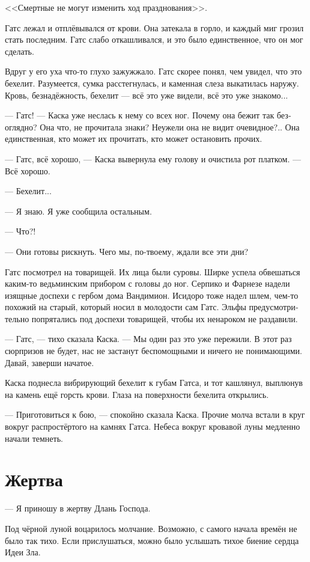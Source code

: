 \documentclass[a4paper,12pt,fleqn]{book}\usepackage{polyglossia}\setdefaultlanguage[babelshorthands=true]{russian}\setotherlanguage{english}\defaultfontfeatures{Ligatures=TeX,Mapping=tex-text}\usepackage{xcolor}\newcommand{\ml}[3]{#2}
\begin{document}
<<Смертные не могут изменить ход празднования>>.

Гатс лежал и отплёвывался от крови.
Она затекала в горло, и каждый миг грозил стать последним.
Гатс слабо откашливался, и это было единственное, что он мог сделать.

Вдруг у его уха что-то глухо зажужжало.
Гатс скорее понял, чем увидел, что это бехелит.
Разумеется, сумка расстегнулась, и каменная слеза выкатилась наружу.
Кровь, безнадёжность, бехелит --- всё это уже видели, всё это уже знакомо...

--- Гатс! --- Каска уже неслась к нему со всех ног.
Почему она бежит так безоглядно?
Она что, не прочитала знаки?
Неужели она не видит очевидное?..
Она единственная, кто может их прочитать, кто может остановить прочих.

--- Гатс, всё хорошо, --- Каска вывернула ему голову и очистила рот платком.
--- Всё хорошо.

--- Бехелит...

--- Я знаю.
Я уже сообщила остальным.

--- Что?!

--- Они готовы рискнуть.
Чего мы, по-твоему, ждали все эти дни?

Гатс посмотрел на товарищей.
Их лица были суровы.
Ширке успела обвешаться каким-то ведьминским прибором с головы до ног.
Серпико и Фарнезе надели изящные доспехи с гербом дома Вандимион.
Исидоро тоже надел шлем, чем-то похожий на старый, который носил в молодости сам Гатс.
Эльфы предусмотрительно попрятались под доспехи товарищей, чтобы их ненароком не раздавили.

--- Гатс, --- тихо сказала Каска.
--- Мы один раз это уже пережили.
В этот раз сюрпризов не будет, нас не застанут беспомощными и ничего не понимающими.
Давай, заверши начатое.

Каска поднесла вибрирующий бехелит к губам Гатса, и тот кашлянул, выплюнув на камень ещё горсть крови.
Глаза на поверхности бехелита открылись.

--- Приготовиться к бою, --- спокойно сказала Каска.
Прочие молча встали в круг вокруг распростёртого на камнях Гатса.
Небеса вокруг кровавой луны медленно начали темнеть.

\section{Жертва}

--- Я приношу в жертву Длань Господа.

Под чёрной луной воцарилось молчание.
Возможно, с самого начала времён не было так тихо.
Если прислушаться, можно было услышать тихое биение сердца Идеи Зла.
\end{document}
